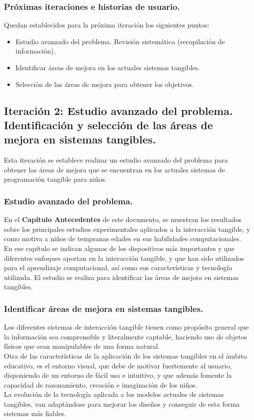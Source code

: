 \subsubsection{Próximas iteraciones e historias de usuario.}
Quedan establecidos para la próxima iteración los siguientes puntos:
\begin{itemize}
\item Estudio avanzado del problema. Revisión sistemática (recopilación de información).
\item Identificar áreas de mejora en los actuales sistemas tangibles.
\item Selección de las áreas de mejora para obtener los objetivos.
\end{itemize}


\subsection{Iteración 2: Estudio avanzado del problema. Identificación y selección de las áreas de mejora en sistemas tangibles.}

Esta iteración se establece realizar un estudio avanzado del problema para obtener las áreas de mejora que se encuentran en los actuales sistemas de programación tangible para niños.


\subsubsection{Estudio avanzado del problema.}
En el \textbf{Capítulo Antecedentes} de este documento, se muestran los resultados sobre los principales estudios experimentales aplicados a la interacción tangible, y como motiva a niños de tempranas edades en sus habilidades computacionales. En ese capítulo se indican algunos de los dispositivos más importantes y que diferentes enfoques aportan en la interacción tangible, y que han sido utilizados para el aprendizaje computacional, así como sus características y tecnología utilizada. El estudio se realiza para identificar las áreas de mejora en sistemas tangibles.

\subsubsection{Identificar áreas de mejora en sistemas tangibles.}
Los diferentes sistemas de interacción tangible tienen como propósito general que la
información sea comprensible y literalmente captable, haciendo uso de objetos físicos
que sean manipulables de una forma natural.\\
Otra de las características de la aplicación de los sistemas tangibles en el ámbito
educativo, es el entorno visual, que debe de motivar fuertemente al usuario, disponiendo
de un entorno de fácil uso e intuitivo, y que además fomente la capacidad de
razonamiento, creación e imaginación de los niños.\\
La evolución de la tecnología aplicada a los modelos actuales de sistemas tangibles, van
adaptándose para mejorar los diseños y conseguir de esta forma sistemas más fiables.

